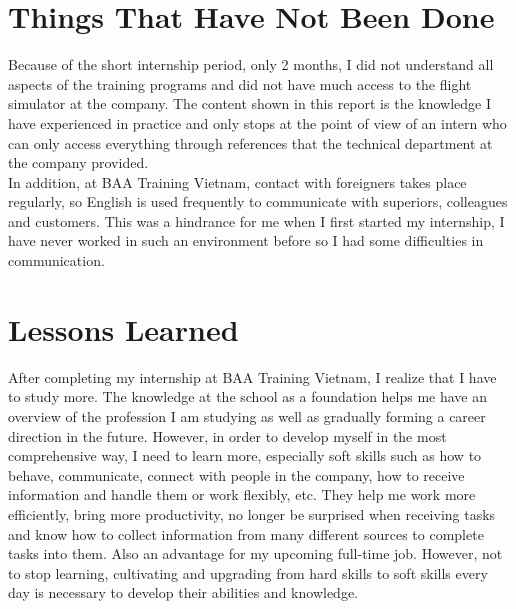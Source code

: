 \section{Things That Have Not Been Done}
    Because of the short internship period, only 2 months, I did not understand all aspects of the training programs 
    and did not have much access to the flight simulator at the company. The content shown in this report is the knowledge 
    I have experienced in practice and only stops at the point of view of an intern who can only access everything through 
    references that the technical department at the company provided. \\ 
    \vspace{3mm}
    In addition, at BAA Training Vietnam, contact with foreigners takes place regularly, so English is used frequently to 
    communicate with superiors, colleagues and customers. This was a hindrance for me when I first started my internship, 
    I have never worked in such an environment before so I had some difficulties in communication.

\section{Lessons Learned}
    After completing my internship at BAA Training Vietnam, I realize that I have to study more. The knowledge at the school 
    as a foundation helps me have an overview of the profession I am studying as well as gradually forming a career direction 
    in the future. However, in order to develop myself in the most comprehensive way, I need to learn more, especially soft 
    skills such as how to behave, communicate, connect with people in the company, how to receive information and handle them 
    or work flexibly, etc. They help me work more efficiently, bring more productivity, no longer be surprised when receiving 
    tasks and know how to collect information from many different sources to complete tasks into them. Also an advantage for 
    my upcoming full-time job. However, not to stop learning, cultivating and upgrading from hard skills to soft skills every 
    day is necessary to develop their abilities and knowledge.